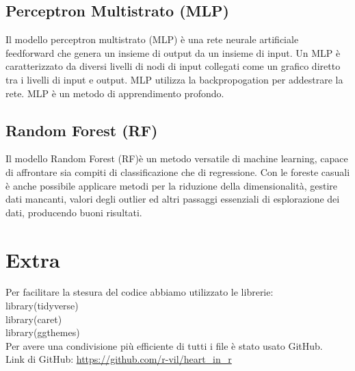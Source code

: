 \documentclass{article}
\begin{document}
\subsection {Perceptron Multistrato (MLP) }
Il modello perceptron multistrato (MLP) è una rete neurale artificiale feedforward che genera un insieme di output da un insieme di input. Un MLP è caratterizzato da diversi livelli di nodi di input collegati come un grafico diretto tra i livelli di input e output. MLP utilizza la backpropogation per addestrare la rete. MLP è un metodo di apprendimento profondo.

\subsection {Random Forest (RF) }
Il modello Random Forest (RF)è un metodo versatile di machine learning, capace di affrontare sia compiti di classificazione che di regressione. Con le foreste casuali è anche possibile applicare metodi per la riduzione della dimensionalità, gestire dati mancanti, valori degli outlier ed altri passaggi essenziali di esplorazione dei dati, producendo buoni risultati.



\section { Extra }
Per facilitare la stesura del codice abbiamo utilizzato le librerie:\\
library(tidyverse)\\
library(caret)\\
library(ggthemes)\\
Per avere una condivisione più efficiente di tutti i file è stato usato GitHub.\\
Link di GitHub: \url{https://github.com/r-vil/heart_in_r}
\end{document}
